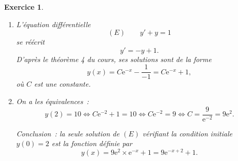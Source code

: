 \documentclass[10pt]{article}
\newtheorem{exo}{Exercice}
\begin{document}
\begin{exo}

\begin{enumerate}
\item L'équation différentielle \[(E)\qquad y'+y=1\] se réécrit \[y'=-y+1.\] D'après le théorème 4 du cours, ses solutions sont de la forme
\[y(x)=C\text{e}^{-x}-\frac{1}{-1}=C\text{e}^{-x}+1,\] où $C$ est une constante.
\item On a les équivalences~:
\[y(2)=10\iff C\text{e}^{-2}+1=10\iff C\text{e}^{-2}=9\iff C=\frac{9}{\text{e}^{-2}}=9\text{e}^{2}.\]

Conclusion~: la seule solution de $(E)$ vérifiant la condition initiale $y(0)=2$ est la fonction définie par
\[y(x)=9\text{e}^{2}\times \text{e}^{-x}+1=9\text{e}^{-x+2}+1.\]

\end{enumerate}

\end{exo}
\end{document}

